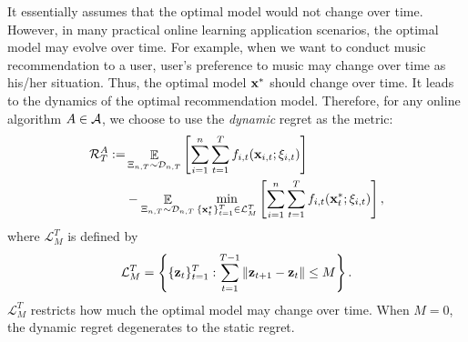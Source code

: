 \documentclass{article}
\def\rc{\color {red}}
\begin{document}
%
%
It essentially assumes that the optimal model would not change over time. However, in many practical online learning application scenarios, the optimal model may evolve over time. For example, when we want to conduct music recommendation to a user, user's preference to music may change over time as his/her situation.  Thus, the optimal model ${\bf x}^\ast$ should change over time. It leads to the dynamics of the optimal recommendation model. Therefore, for any online algorithm $A\in{\mathcal{A}}$, we choose to use the \emph{dynamic} regret as the metric:
\begin{align}
\nonumber
{\mathcal{R}}_T^{A} := & \mathop{\mathbb{E}}_{ \Xi_{n,T} \sim \mathcal{D}_{n,T} }  \left[\sum_{i=1}^n\sum_{t=1}^T f_{i,t}({\bf x}_{i,t};\xi_{i,t}) \right]
\\ \label{equa_definition_our_regret}
& - \mathop{\mathbb{E}}_{ \Xi_{n,T} \sim \mathcal{D}_{n,T} }\min_{\{{\bf x}_t^\star\}_{t=1}^T \in \mathcal{L}_{M}^T}  \left[\sum_{i=1}^n\sum_{t=1}^T f_{i,t}({\bf x}_t^\ast;\xi_{i,t}) \right],
\end{align}
where $\mathcal{L}_M^T$ is defined by
\begin{align}
\nonumber
{\mathcal{L}}_{M}^T = \left\{\{{\bf z}_t\}_{t=1}^T : \sum\limits_{t=1}^{T-1}\|{\bf z}_{t+1}-{\bf z}_t\|\le M \right\}.
\end{align} $\mathcal{L}_M^T$ restricts how much the optimal model may change over time. When $M=0$, the dynamic regret degenerates to the static regret.
\end{document}
